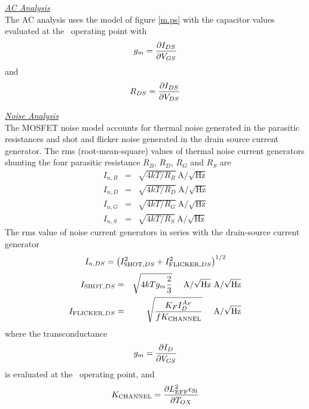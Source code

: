 \noindent\underline{\sl \large AC Analysis}\\[0.1in]
The AC analysis uses the model of figure  \ref{m.ps} with the capacitor values
evaluated at the \dc\ operating point with
\begin{equation}
g_m = {{\textstyle\partial I_{DS}} \over {\textstyle\partial V_{GS}}}
\end{equation}
and
\begin{equation}
R_{DS} = {{\textstyle\partial I_{DS}} \over {\textstyle\partial V_{DS}}}
\end{equation}

\clearpage
\noindent\underline{\sl \large Noise Analysis}\\[0.1in]
The MOSFET noise model accounts for thermal noise generated in the
parasitic resistances and shot and flicker noise generated in the
drain source current generator.  The rms (root-mean-square) values of
thermal noise current generators shunting the four parasitic resistance
$R_B$, $R_D$, $R_G$ and $R_S$ are
\begin{eqnarray}
I_{n,B} &=& \sqrt{4kT/R_B}~\mbox{A/}\sqrt{\mbox{Hz}}\\
I_{n,D} &=& \sqrt{4kT/R_D}~\mbox{A/}\sqrt{\mbox{Hz}}\\
I_{n,G} &=& \sqrt{4kT/R_G}~\mbox{A/}\sqrt{\mbox{Hz}}\\
I_{n,S} &=& \sqrt{4kT/R_S}~\mbox{A/}\sqrt{\mbox{Hz}}
\end{eqnarray}
The rms value of
noise current generators in series with the drain-source current generator
\begin{equation}
I_{n,DS} = \left( I_{\mbox{\scriptsize SHOT},DS}^2 + I_{\mbox{\scriptsize FLICKER},DS}^2 \right)^{1/2}
\end{equation}
\begin{eqnarray}
I_{\mbox{\scriptsize SHOT},DS} &=& \sqrt{4kTg_m\frac{2}{3}} ~~~~\mbox{A/}\sqrt{\mbox{Hz}}
~\mbox{A/}\sqrt{\mbox{Hz}}\\
I_{\mbox{\scriptsize FLICKER},DS} &=& \sqrt{{{\textstyle K_F I_{D}^{A_F}} 
                         \over {\textstyle f K_{\mbox{\scriptsize CHANNEL}}}}}
~~~~\mbox{A/}\sqrt{\mbox{Hz}}
\end{eqnarray}
where the transconductance
\begin{equation}
g_m = {{\textstyle\partial I_{D}} \over {\textstyle\partial V_{GS}}}
\end{equation}
is evaluated at the \dc\ operating point, and
\begin{equation}
K_{\mbox{\scriptsize CHANNEL}} = {{\textstyle\partial L_{\mbox{\scriptsize EFF}}^2\epsilon_{\mbox{\scriptsize Si}}} \over
                   {\textstyle\partial T_{OX}}}
\end{equation}

